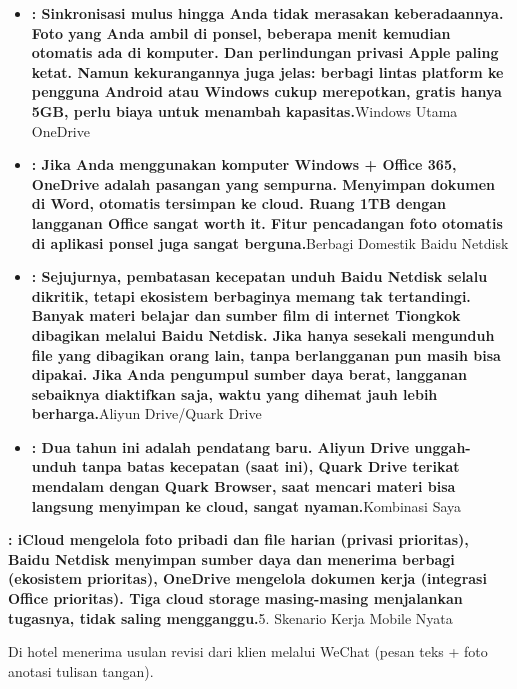 \begin{itemize}
  \item \textbf{: Sinkronisasi mulus hingga Anda tidak merasakan keberadaannya. Foto yang Anda ambil di ponsel, beberapa menit kemudian otomatis ada di komputer. Dan perlindungan privasi Apple paling ketat. Namun kekurangannya juga jelas: berbagi lintas platform ke pengguna Android atau Windows cukup merepotkan, gratis hanya 5GB, perlu biaya untuk menambah kapasitas.}Windows Utama OneDrive
  \item \textbf{: Jika Anda menggunakan komputer Windows + Office 365, OneDrive adalah pasangan yang sempurna. Menyimpan dokumen di Word, otomatis tersimpan ke cloud. Ruang 1TB dengan langganan Office sangat worth it. Fitur pencadangan foto otomatis di aplikasi ponsel juga sangat berguna.}Berbagi Domestik Baidu Netdisk
  \item \textbf{: Sejujurnya, pembatasan kecepatan unduh Baidu Netdisk selalu dikritik, tetapi ekosistem berbaginya memang tak tertandingi. Banyak materi belajar dan sumber film di internet Tiongkok dibagikan melalui Baidu Netdisk. Jika hanya sesekali mengunduh file yang dibagikan orang lain, tanpa berlangganan pun masih bisa dipakai. Jika Anda pengumpul sumber daya berat, langganan sebaiknya diaktifkan saja, waktu yang dihemat jauh lebih berharga.}Aliyun Drive/Quark Drive
  \item \textbf{: Dua tahun ini adalah pendatang baru. Aliyun Drive unggah-unduh tanpa batas kecepatan (saat ini), Quark Drive terikat mendalam dengan Quark Browser, saat mencari materi bisa langsung menyimpan ke cloud, sangat nyaman.}Kombinasi Saya
\end{itemize}

\textbf{: iCloud mengelola foto pribadi dan file harian (privasi prioritas), Baidu Netdisk menyimpan sumber daya dan menerima berbagi (ekosistem prioritas), OneDrive mengelola dokumen kerja (integrasi Office prioritas). Tiga cloud storage masing-masing menjalankan tugasnya, tidak saling mengganggu.}5. Skenario Kerja Mobile Nyata


Di hotel menerima usulan revisi dari klien melalui WeChat (pesan teks + foto anotasi tulisan tangan).


